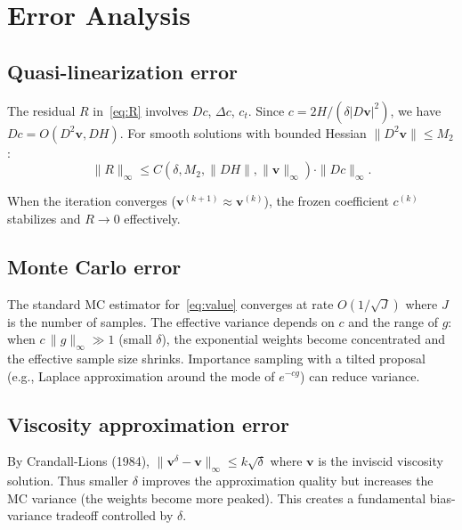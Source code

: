 \documentclass[11pt]{article}
\newcommand{\bv}{\bm{v}}
\begin{document}
\section{Error Analysis}

\subsection{Quasi-linearization error}

The residual $R$ in~\eqref{eq:R} involves $Dc$, $\Delta c$, $c_t$.
Since $c = 2H/(\delta|D\bv|^2)$, we have $Dc = O(D^2\bv, DH)$.
For smooth solutions with bounded Hessian $\|D^2\bv\| \le M_2$:
\[
  \|R\|_\infty \le C(\delta, M_2, \|DH\|, \|\bv\|_\infty)\cdot\|Dc\|_\infty.
\]

When the iteration converges ($\bv^{(k+1)}\approx\bv^{(k)}$), the
frozen coefficient $c^{(k)}$ stabilizes and $R\to 0$ effectively.

\subsection{Monte Carlo error}

The standard MC estimator for~\eqref{eq:value} converges at rate $O(1/\sqrt{J})$
where $J$ is the number of samples.  The effective variance depends on
$c$ and the range of $g$: when $c\,\|g\|_\infty \gg 1$ (small $\delta$),
the exponential weights become concentrated and the effective sample size
shrinks.  Importance sampling with a tilted proposal (e.g., Laplace
approximation around the mode of $e^{-cg}$) can reduce variance.

\subsection{Viscosity approximation error}

By Crandall-Lions (1984), $\|\bv^\delta - \bv\|_\infty \le k\sqrt{\delta}$
where $\bv$ is the inviscid viscosity solution.  Thus smaller $\delta$
improves the approximation quality but increases the MC variance
(the weights become more peaked).  This creates a fundamental
bias-variance tradeoff controlled by $\delta$.
\end{document}
